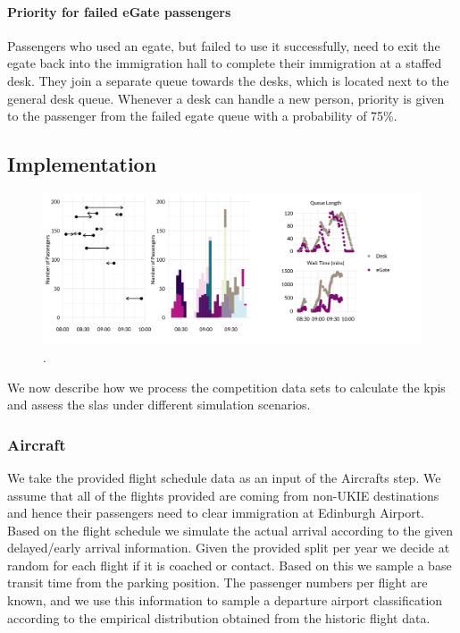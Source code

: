 \documentclass[10pt]{article}
\begin{document}
\paragraph{Priority for failed eGate passengers}
Passengers who used an \gls{egate}, but failed to use it successfully, need to exit the \gls{egate} back into the immigration hall to complete their immigration at a staffed desk. They join a separate queue towards the desks, which is located next to the general desk queue. Whenever a desk can handle a new person, priority is given to the passenger from the failed \gls{egate} queue with a probability of 75\%.


\subsection{Implementation}

\begin{figure}[!ht]
    \centering
    \includegraphics[width=\textwidth]{figures/workflow_fig.png}
     \caption{
    .} \label{fig:workflow_fig}
\end{figure}
We now describe how we process the competition data sets to calculate the \glspl{kpi} and assess the \glspl{sla} under different simulation scenarios.

\subsubsection{Aircraft}
We take the provided flight schedule data as an input of the Aircrafts step. We assume that all of the flights provided are coming from non-UKIE destinations and hence their passengers need to clear immigration at Edinburgh Airport. Based on the flight schedule we simulate the actual arrival according to the given delayed/early arrival information. Given the provided split per year we decide at random for each flight if it is coached or contact. Based on this we sample a base transit time from the parking position. The passenger numbers per flight are known, and we use this information to sample a departure airport classification according to the empirical distribution obtained from the historic flight data.
\end{document}
